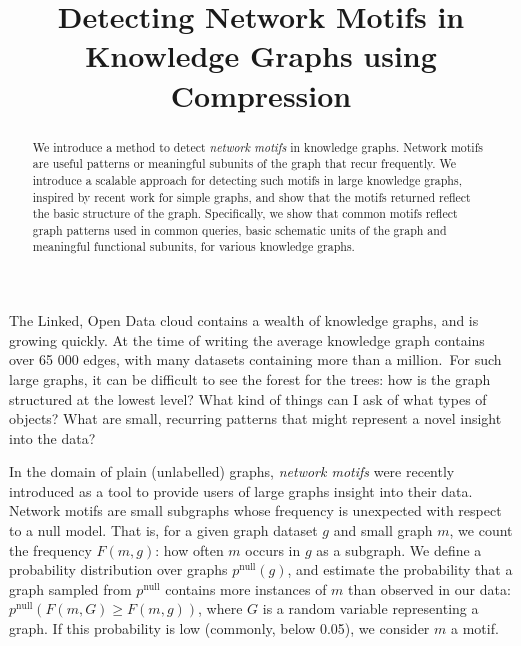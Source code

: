 \documentclass[11pt]{article}
\title{Detecting Network Motifs in Knowledge Graphs using Compression}
\begin{document}
\maketitle

\begin{abstract}
We introduce a method to detect \emph{network motifs} in knowledge graphs. Network motifs are useful patterns or meaningful subunits of the graph that recur frequently. We introduce a scalable approach for detecting such motifs in large knowledge graphs, inspired by recent work for simple graphs, and show that the motifs returned reflect the basic structure of the graph. Specifically, we show that common motifs reflect graph patterns used in common queries, basic schematic units of the graph and meaningful functional subunits, for various knowledge graphs.
\end{abstract}

\noindent The Linked, Open Data cloud contains a wealth of knowledge graphs, and is growing quickly. At the time of writing the average knowledge graph contains over 65 000 edges, with many datasets containing more than a million.\footnotemark~For such large graphs, it can be difficult to see the forest for the trees: how is the graph structured at the lowest level? What kind of things can I ask of what types of objects? What are small, recurring patterns that might represent a novel insight into the data?


In the domain of plain (unlabelled) graphs, \emph{network motifs} \cite{milo} were recently introduced as a tool to provide users of large graphs insight into their data. Network motifs are small subgraphs whose frequency is unexpected with respect to a null model. That is, for a given graph dataset $g$ and small graph $m$, we count the frequency $F(m, g)$: how often $m$ occurs in $g$ as a subgraph. We define a probability distribution over graphs $p^\text{null}(g)$, and estimate the probability that a graph sampled from $p^\text{null}$ contains more instances of $m$ than observed in our data: $p^\text{null}(F(m, G) \geq F(m, g))$, where $G$ is a random variable representing a graph. If this probability is low (commonly, below 0.05), we consider $m$ a motif. \footnotemark

\end{document}
